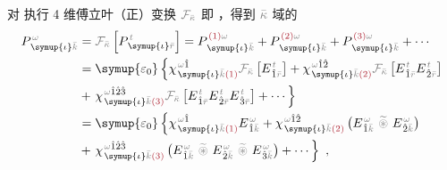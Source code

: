 对  执行 4 维傅立叶（正）变换\cite{xieAnalytic3DVector} $\mathcolor{gray}{\mathcal F_{\bar{\kappa}}}$ 即 ，得到 $\mathcolor{gray}{\bar{\kappa}}$ 域的
\begin{subequations}
\begin{align}
	P^{\;\!\mathcolor{gray}{\omega}}_{\;\! \symup{\iota}\mathcolor{gray}{\bar{k}}} &= \mathcolor{gray}{\mathcal F_{\bar{\kappa}}} \left[ P^{\;\! \mathcolor{gray}{t}}_{\;\! \symup{\iota}\mathcolor{gray}{\bar{r}}} \right] = P^{\;\! \textcolor{Maroon}{(1)} \mathcolor{gray}{\omega}}_{\;\! \symup{\iota}\mathcolor{gray}{\bar{k}}} + P^{\;\! \textcolor{Maroon}{(2)} \mathcolor{gray}{\omega}}_{\;\! \symup{\iota}\mathcolor{gray}{\bar{k}}} + P^{\;\! \textcolor{Maroon}{(3)} \mathcolor{gray}{\omega}}_{\;\! \symup{\iota}\mathcolor{gray}{\bar{k}}} + \cdots \\ &= {\symup{\varepsilon_0}} \left\{ \chi^{\;\! \mathcolor{gray}{\omega} \hat{1}}_{\;\! \symup{\iota} \mathcolor{gray}{\bar{k}} \textcolor{Maroon}{(1)}} \mathcolor{gray}{\mathcal F_{\bar{\kappa}}} \left[ E^{\;\!\mathcolor{gray}{t}}_{\;\! \hat{1} \mathcolor{gray}{\bar{r}}} \right] + \chi^{\;\! \mathcolor{gray}{\omega} \hat{1} \hat{2}}_{\;\! \symup{\iota} \mathcolor{gray}{\bar{k}} \textcolor{Maroon}{(2)}} \mathcolor{gray}{\mathcal F_{\bar{\kappa}}} \left[ E^{\;\!\mathcolor{gray}{t}}_{\;\! \hat{1} \mathcolor{gray}{\bar{r}}} E^{\;\!\mathcolor{gray}{t}}_{\;\! \hat{2} \mathcolor{gray}{\bar{r}}} \right] \right. \label{eq:P_wk} \\ &+ \left. \chi^{\;\! \mathcolor{gray}{\omega} \hat{1} \hat{2} \hat{3}}_{\;\! \symup{\iota} \mathcolor{gray}{\bar{k}} \textcolor{Maroon}{(3)}} \mathcolor{gray}{\mathcal F_{\bar{\kappa}}} \left[ E^{\;\!\mathcolor{gray}{t}}_{\;\! \hat{1} \mathcolor{gray}{\bar{r}}} E^{\;\!\mathcolor{gray}{t}}_{\;\! \hat{2} \mathcolor{gray}{\bar{r}}} E^{\;\!\mathcolor{gray}{t}}_{\;\! \hat{3} \mathcolor{gray}{\bar{r}}} \right] + \cdots \right\}
	\\ &= {\symup{\varepsilon_0}} \left\{ \chi^{\;\! \mathcolor{gray}{\omega} \hat{1}}_{\;\! \symup{\iota} \mathcolor{gray}{\bar{k}} \textcolor{Maroon}{(1)}} E^{\;\!\mathcolor{gray}{\omega}}_{\;\! \hat{1} \mathcolor{gray}{\bar{k}}} + \chi^{\;\! \mathcolor{gray}{\omega} \hat{1} \hat{2}}_{\;\! \symup{\iota} \mathcolor{gray}{\bar{k}} \textcolor{Maroon}{(2)}} \left( E^{\;\!\mathcolor{gray}{\omega}}_{\;\! \hat{1} \mathcolor{gray}{\bar{k}}} ~\mathcolor{gray}{\widetilde \circledast}~ E^{\;\!\mathcolor{gray}{\omega}}_{\;\! \hat{2} \mathcolor{gray}{\bar{k}}} \right) \right. \label{eq:P_wk2} \\ &+ \left. \chi^{\;\! \mathcolor{gray}{\omega} \hat{1} \hat{2} \hat{3}}_{\;\! \symup{\iota} \mathcolor{gray}{\bar{k}} \textcolor{Maroon}{(3)}} \left( E^{\;\!\mathcolor{gray}{\omega}}_{\;\! \hat{1} \mathcolor{gray}{\bar{k}}} ~\mathcolor{gray}{\widetilde \circledast}~ E^{\;\!\mathcolor{gray}{\omega}}_{\;\! \hat{2} \mathcolor{gray}{\bar{k}}} ~\mathcolor{gray}{\widetilde \circledast}~ E^{\;\!\mathcolor{gray}{\omega}}_{\;\! \hat{3} \mathcolor{gray}{\bar{k}}} \right) + \cdots \right\}~,
\end{align}
\end{subequations}
